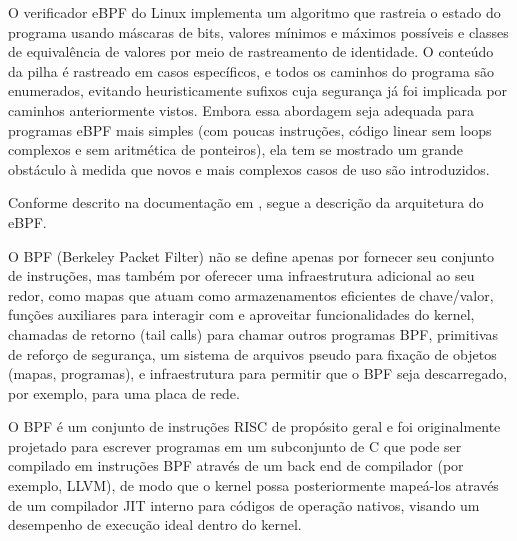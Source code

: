 \documentclass[sigconf]{acmart}
\begin{document}
O verificador eBPF do Linux implementa um algoritmo que rastreia o estado do programa usando máscaras de bits, valores mínimos e máximos possíveis e classes de equivalência de valores por meio de rastreamento de identidade. O conteúdo da pilha é rastreado em casos específicos, e todos os caminhos do programa são enumerados, evitando heuristicamente sufixos cuja segurança já foi implicada por caminhos anteriormente vistos. Embora essa abordagem seja adequada para programas eBPF mais simples (com poucas instruções, código linear sem loops complexos e sem aritmética de ponteiros), ela tem se mostrado um grande obstáculo à medida que novos e mais complexos casos de uso são introduzidos.

Conforme descrito na documentação em \cite{Cilium}, segue a descrição da arquitetura do eBPF.

O BPF (Berkeley Packet Filter) não se define apenas por fornecer seu conjunto de instruções, mas também por oferecer uma infraestrutura adicional ao seu redor, como mapas que atuam como armazenamentos eficientes de chave/valor, funções auxiliares para interagir com e aproveitar funcionalidades do kernel, chamadas de retorno (tail calls) para chamar outros programas BPF, primitivas de reforço de segurança, um sistema de arquivos pseudo para fixação de objetos (mapas, programas), e infraestrutura para permitir que o BPF seja descarregado, por exemplo, para uma placa de rede.

O BPF é um conjunto de instruções RISC de propósito geral e foi originalmente projetado para escrever programas em um subconjunto de C que pode ser compilado em instruções BPF através de um back end de compilador (por exemplo, LLVM), de modo que o kernel possa posteriormente mapeá-los através de um compilador JIT interno para códigos de operação nativos, visando um desempenho de execução ideal dentro do kernel.
\end{document}
